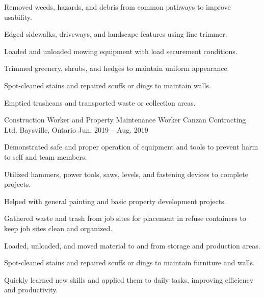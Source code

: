 \begin{cventries}
{\begin{cvitems}
        \item {Removed weeds, hazards, and debris from common pathways to improve usability.}
        \item{Edged sidewalks, driveways, and landscape features using line trimmer.}
        \item{Loaded and unloaded mowing equipment with load securement conditions.}
        \item{Trimmed greenery, shrubs, and hedges to maintain uniform appearance.}
        \item{Spot-cleaned stains and repaired scuffs or dings to maintain walls.}
        \item{Emptied trashcans and transported waste or collection areas.}
      \end{cvitems}
    }

  \cventry
    {Construction Worker and Property Maintenance Worker} %
    {Canzan Contracting Ltd.} %
    {Baysville, Ontario} %
    {Jun. 2019 -- Aug. 2019} %
    {
      \begin{cvitems} %
        \item {Demonstrated safe and proper operation of equipment and tools to prevent harm to self and team members.}
        \item {Utilized hammers, power tools, saws, levels, and fastening devices to complete projects.}
        \item {Helped with general painting and basic property development projects.}
        \item {Gathered waste and trash from job sites for placement in refuse containers to keep job sites clean and organized.}
        \item {Loaded, unloaded, and moved material to and from storage and production areas.}
        \item {Spot-cleaned stains and repaired scuffs or dings to maintain furniture and walls.}
        \item {Quickly learned new skills and applied them to daily tasks, improving efficiency and productivity.}
      \end{cvitems}
    }
\end{cventries}

